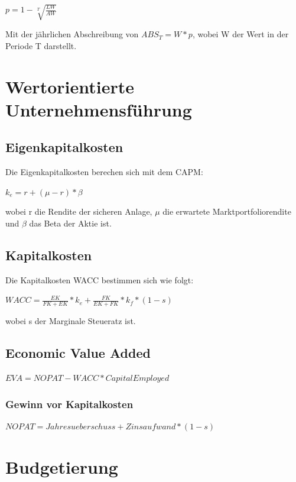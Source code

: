 \documentclass{article}
\begin{document}
\begin{center}
$ p = 1 - \sqrt[T]{\frac{LW}{AW}}$
\end{center}

Mit der jährlichen Abschreibung von $ABS_T = W * p$, wobei W der Wert in der Periode T darstellt.

\section{Wertorientierte Unternehmensführung}

\subsection{Eigenkapitalkosten}
Die Eigenkapitalkosten berechen sich mit dem CAPM:
\begin{center}

$ k_e = r + ( \mu - r ) * \beta $
\end{center}
wobei r die Rendite der sicheren Anlage, $ \mu $ die erwartete Marktportfoliorendite und  $ \beta $ das Beta der Aktie ist.

\subsection{Kapitalkosten}
Die Kapitalkosten WACC bestimmen sich wie folgt:
\begin{center}

$WACC = \frac{EK}{FK + EK} * k_{e} + \frac{FK}{EK + FK} * k_{f} * (1-s)$
\end{center}
wobei s der Marginale Steueratz ist.

\subsection{Economic Value Added}
\begin{center}

$EVA =  NOPAT - WACC * CapitalEmployed $
\end{center}
\subsubsection{Gewinn vor Kapitalkosten}
\begin{center}

$NOPAT = Jahresueberschuss + Zinsaufwand * (1 - s)$
\end{center}

\section{Budgetierung}
\end{document}
